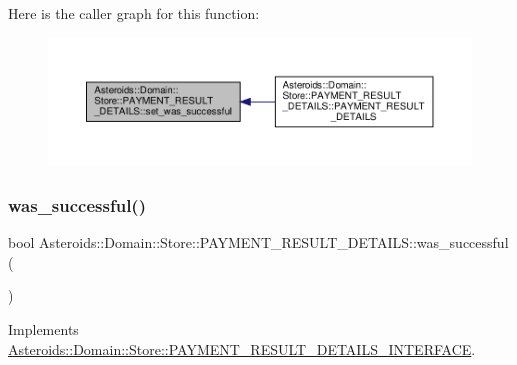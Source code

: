 Here is the caller graph for this function\+:\nopagebreak
\begin{figure}[H]
\begin{center}
\leavevmode
\includegraphics[width=350pt]{classAsteroids_1_1Domain_1_1Store_1_1PAYMENT__RESULT__DETAILS_aca004f43f5b89b0560525e60d171faf2_icgraph}
\end{center}
\end{figure}
\mbox{\label{classAsteroids_1_1Domain_1_1Store_1_1PAYMENT__RESULT__DETAILS_a9fd78a2e32a59b9b0a372c9422aa61cb}} 
\subsubsection{\texorpdfstring{was\+\_\+successful()}{was\_successful()}}
{\footnotesize\ttfamily bool Asteroids\+::\+Domain\+::\+Store\+::\+P\+A\+Y\+M\+E\+N\+T\+\_\+\+R\+E\+S\+U\+L\+T\+\_\+\+D\+E\+T\+A\+I\+L\+S\+::was\+\_\+successful (\begin{DoxyParamCaption}{ }\end{DoxyParamCaption})\hspace{0.3cm}{\ttfamily [virtual]}}



Implements \hyperlink{classAsteroids_1_1Domain_1_1Store_1_1PAYMENT__RESULT__DETAILS__INTERFACE_a94434f4fef8027eb4e9862043ee6521f}{Asteroids\+::\+Domain\+::\+Store\+::\+P\+A\+Y\+M\+E\+N\+T\+\_\+\+R\+E\+S\+U\+L\+T\+\_\+\+D\+E\+T\+A\+I\+L\+S\+\_\+\+I\+N\+T\+E\+R\+F\+A\+CE}.



